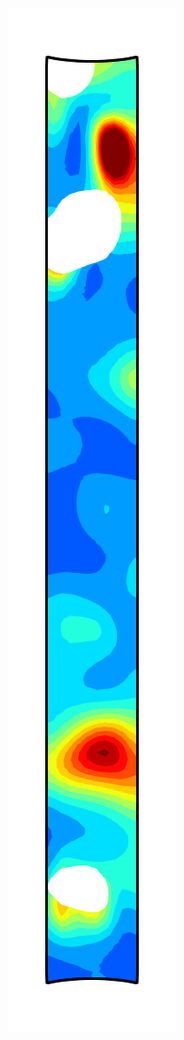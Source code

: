 \begin{figure}[!htb]
\begin{subfigure}{0.08\textwidth}
  \end{subfigure}
  \begin{subfigure}{0.08\textwidth}
    \centering
    \includegraphics[width=\textwidth]{Chapter5/figures/spallation/ep_4}

\end{subfigure}
\end{figure}
